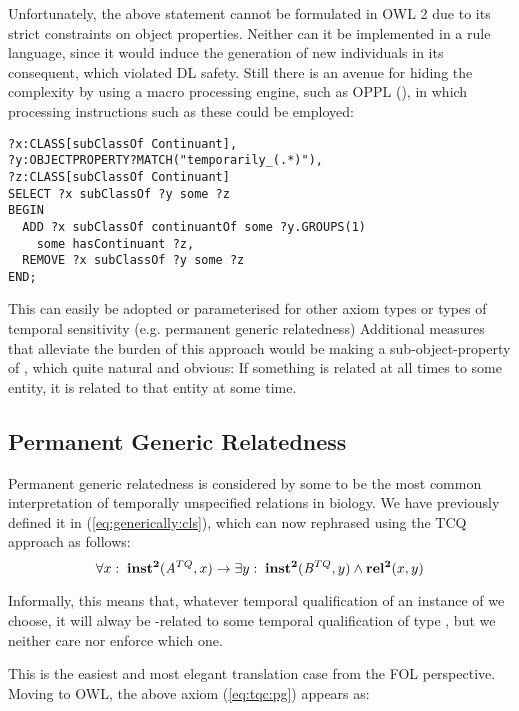 
Unfortunately, the above statement cannot be formulated in OWL 2 due to its
strict constraints on object properties. Neither can it be implemented in a
rule language, since it would induce the generation of new individuals in its
consequent, which violated DL safety. Still there is an avenue for hiding the
complexity by using a macro processing engine, such as OPPL (\cite{OPPL}), in
which processing instructions such as these could be employed:

\begin{lstlisting}
?x:CLASS[subClassOf Continuant],
?y:OBJECTPROPERTY?MATCH("temporarily_(.*)"),
?z:CLASS[subClassOf Continuant]
SELECT ?x subClassOf ?y some ?z
BEGIN
  ADD ?x subClassOf continuantOf some ?y.GROUPS(1)
    some hasContinuant ?z,
  REMOVE ?x subClassOf ?y some ?z
END;
\end{lstlisting}
This can easily be adopted or parameterised for other axiom types or types of temporal
sensitivity (e.g. permanent generic relatedness) Additional measures that alleviate the burden of this approach would be making
 a sub-object-property of , which quite natural and
obvious: If something is related at all times to some entity, it is related to
that entity at some time.



\subsection*{Permanent Generic Relatedness}
Permanent generic relatedness is considered by some to be the most common
interpretation of temporally unspecified relations in biology. We have
previously defined it in (\ref{eq:generically:cls}), which can
now rephrased using the TCQ approach as follows:
\begin{equation}
\forall x:\; \mathrm{\mathbf{inst^2}}(\mathit{A}^{TQ},x) \rightarrow \exists y :\;
\mathrm{\mathbf{inst^2}}(\mathit{B}^{TQ}, y) \wedge \mathrm{\mathbf{rel^2}}(x,y)
\label{eq:tqc:pg}
\end{equation}

Informally, this means that, whatever temporal qualification of an instance of
 we choose, it will alway be -related to some temporal
qualification of type , but we neither care nor enforce which one.

This is the easiest and most elegant translation case from the FOL perspective.
Moving to OWL, the above axiom (\ref{eq:tqc:pg}) appears as:

